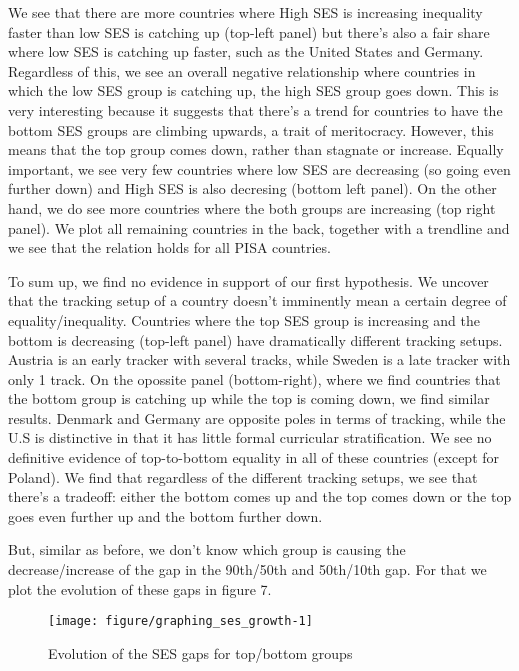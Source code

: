 \documentclass[11pt, a4paper]{article}\usepackage[]{graphicx}\usepackage[]{color}
\begin{document}

We see that there are more countries where High SES is increasing inequality faster than low SES is catching up (top-left panel) but there's also a fair share where low SES is catching up faster, such as the United States and Germany. Regardless of this, we see an overall negative relationship where countries in which the low SES group is catching up, the high SES group goes down. This is very interesting because it suggests that there's a trend for countries to have the bottom SES groups are climbing upwards, a trait of meritocracy. However, this means that the top group comes down, rather than stagnate or increase. Equally important, we see very few countries where low SES are decreasing (so going even further down) and High SES is also decresing (bottom left panel). On the other hand, we do see more countries where the both groups are increasing (top right panel). We plot all remaining countries in the back, together with a trendline and we see that the relation holds for all PISA countries.

To sum up, we find no evidence in support of our first hypothesis. We uncover that the tracking setup of a country doesn't imminently mean a certain degree of equality/inequality. Countries where the top SES group is increasing and the bottom is decreasing (top-left panel) have dramatically different tracking setups. Austria is an early tracker with several tracks, while Sweden is a late tracker with only 1 track. On the opossite panel (bottom-right), where we find countries that the bottom group is catching up while the top is coming down, we find similar results. Denmark and Germany are opposite poles in terms of tracking, while the U.S is distinctive in that it has little formal curricular stratification. We see no definitive evidence of top-to-bottom equality in all of these countries (except for Poland). We find that regardless of the different tracking setups, we see that there's a tradeoff: either the bottom comes up and the top comes down or the top goes even further up and the bottom further down.

But, similar as before, we don't know which group is causing the decrease/increase of the gap in the 90th/50th and 50th/10th gap. For that we plot the evolution of these gaps in figure 7.

\begin{figure}

{\centering \texttt{[image: figure/graphing\_ses\_growth-1]} 

}

\caption[Evolution of the SES gaps for top/bottom groups]{Evolution of the SES gaps for top/bottom groups}\label{fig:graphing_ses_growth}
\end{figure}
\end{document}
